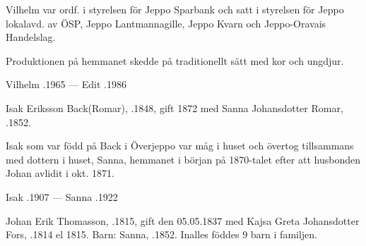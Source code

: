 Vilhelm var ordf. i styrelsen för Jeppo Sparbank och satt i styrelsen för Jeppo lokalavd. av ÖSP, Jeppo Lantmannagille, Jeppo Kvarn och Jeppo-Oravais Handelslag.
\begin{jhchildren}
  \item {}
  \item {}
  \item {}
  \item {}
\end{jhchildren}
Produktionen på hemmanet skedde på traditionellt sätt med kor och ungdjur.

Vilhelm .1965  ---  Edit .1986


Isak Eriksson Back(Romar), .1848, gift 1872 med Sanna Johansdotter Romar, .1852.
\begin{jhchildren}
  \item {}
  \item {}
  \item {}
  \item {}
  \item {}
  \item {}
  \item {}
\end{jhchildren}
Isak som var född på Back i Överjeppo var måg i huset och övertog tillsammans med dottern i huset, Sanna, hemmanet i början på 1870-talet efter att husbonden Johan avlidit i okt. 1871.

Isak .1907  ---  Sanna .1922


Johan Erik Thomasson, .1815, gift den 05.05.1837 med Kajsa Greta Johansdotter Fors, .1814 el 1815.
Barn: Sanna, .1852. Inalles föddes 9 barn i familjen.

